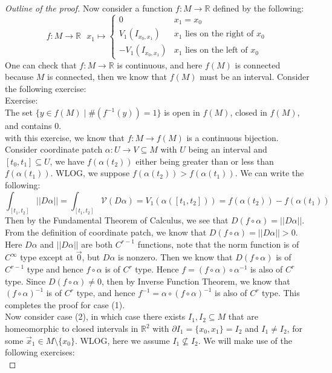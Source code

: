 \documentclass[15pt]{book}
\theoremstyle{break}
\theoremstyle{break}
\newcommand{\R}{\mathbb{R}}
\newcommand{\exercise}{\color{green}Exercise: \color{black}}
\begin{document}
\begin{proof}[Outline of the proof]
Now consider a function $f:M \to \R$ defined by the following: 
$$f:M \to \R \ \ \ x_1\mapsto\begin{cases} 0 & x_1 = x_0 \\ V_1(I_{x_0,x_1}) & x_1\text{ lies on the right of }x_0 \\ -V_1(I_{x_0,x_1}) & x_1\text{ lies on the left of }x_0\end{cases}$$ 
One can check that $f:M \to \R$ is continuous, and here $f(M)$ is connected because $M$ is connected, then we know that $f(M)$ must be an interval. Consider the following exercise:\\

\exercise\\ 
The set $\{y \in f(M)\mid \#(f^{-1}(y)) = 1\}$ is open in $f(M)$, closed in $f(M)$, and contains $0$. \\

with this exercise, we know that $f:M \to f(M)$ is a continuous bijection. Consider coordinate patch $\alpha: U \to V \subseteq M$ with $U$ being an interval and $[t_0,t_1] \subseteq U$, we have $f(\alpha(t_2))$ either being greater than or less than $f(\alpha(t_1))$. WLOG, we suppose $f(\alpha(t_2)) > f(\alpha(t_1))$. We can write the following:
$$\int_{[t_1,t_2]} ||D\alpha|| = \int_{[t_1,t_2]} \mathcal{V}(D\alpha) = V_1(\alpha([t_1,t_2])) = f(\alpha(t_2)) - f(\alpha(t_1))$$
Then by the Fundamental Theorem of Calculus, we see that $D(f\circ \alpha) = ||D\alpha||$. From the definition of coordinate patch, we know that $D(f\circ \alpha) = ||D\alpha|| > 0$. Here $D\alpha$ and $||D\alpha||$ are both $C^{r-1}$ functions, note that the norm function is of $C^\infty$ type except at $\vec{0}$, but $D\alpha$ is nonzero. Then we know that $D(f\circ \alpha)$ is of $C^{r-1}$ type and hence $f\circ \alpha$ is of $C^r$ type. Hence $f = (f\circ \alpha) \circ \alpha^{-1}$ is also of $C^r$ type.  Since $D(f\circ \alpha) \neq 0$, then by Inverse Function Theorem, we know that $(f\circ \alpha)^{-1}$ is of $C^r$ type, and hence $f^{-1} = \alpha \circ (f\circ \alpha)^{-1}$ is also of $C^r$ type. This completes the proof for case (1).\\

Now consider case (2), in which case there exists $I_1, I_2 \subseteq M$ that are homeomorphic to closed intervals in $\R^2$ with $\partial I_1 = \{x_0,x_1\} = I_2$ and $I_1 \neq I_2$, for some $\vec{x}_1 \in M\setminus\{x_0\}$. WLOG, here we assume $I_1 \nsubseteq I_2$. We will make use of the following exercises:\\


\end{proof}
\end{document}
